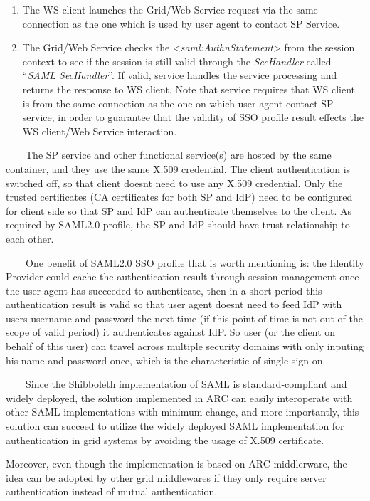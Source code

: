 \documentclass{article}
\begin{document}
\begin{enumerate}
\item The WS client launches the Grid/Web Service request via the same
connection as the one which is used by user agent to contact SP
Service.
\item The Grid/Web Service checks the
{\textless}\textit{saml:AuthnStatement}{\textgreater} from the session
context to see if the session is still valid through the
\textit{SecHandler} called {\textquotedblleft}\textit{SAML
SecHandler}{\textquotedblright}. If valid, service handles the service
processing and returns the response to WS client. Note that service
requires that WS client is from the same connection as the one on which
user agent contact SP service, in order to guarantee that the validity
of SSO profile result effects the WS client/Web Service interaction.
\end{enumerate}
\ \ \ \ The SP service and other functional service(s) are hosted by the
same container, and they use the same X.509 credential. The client
authentication is switched off, so that client doesn{\textquotesingle}t
need to use any X.509 credential. Only the trusted certificates (CA
certificates for both SP and IdP) need to be configured for client side
so that SP and IdP can authenticate themselves to the client. As
required by SAML2.0 profile, the SP and IdP should have trust
relationship to each other.

\ \ \ \ One benefit of SAML2.0 SSO profile that is worth mentioning is:
the Identity Provider could cache the authentication result through
session management once the user agent has succeeded to authenticate,
then in a short period this authentication result is valid so that user
agent doesn{\textquotesingle}t need to feed IdP with
user{\textquotesingle}s username and password the next time (if this
point of time is not out of the scope of valid period) it authenticates
against IdP. So user (or the client on behalf of this user) can travel
across multiple security domains with only inputing his name and
password once, which is the characteristic of single sign-on.

\ \ \ \ Since the Shibboleth implementation of SAML is
standard-compliant and widely deployed, the solution implemented in ARC
can easily interoperate with other SAML implementations with minimum
change, and more importantly, this solution can succeed to utilize the
widely deployed SAML implementation for authentication in grid systems
by avoiding the usage of X.509 certificate.

Moreover, even though the implementation is based on ARC middlerware,
the idea can be adopted by other grid middlewares if they only require
server authentication instead of mutual authentication.
\end{document}
